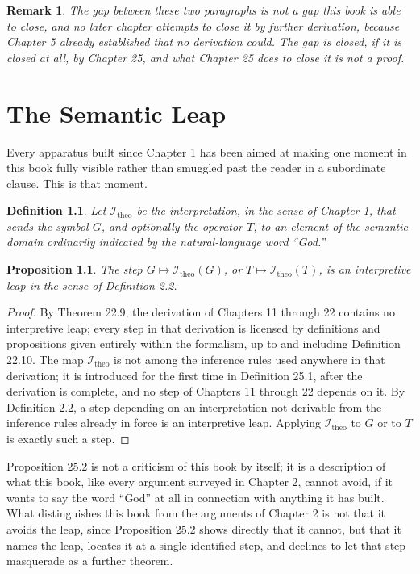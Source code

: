 \documentclass[11pt]{book}
\newtheorem{definition}[theorem]{Definition}
\newtheorem{proposition}[theorem]{Proposition}
\newtheorem{remark}[theorem]{Remark}
\begin{document}
\begin{remark}
The gap between these two paragraphs is not a gap this book is able to close, and no later chapter attempts to close it by further derivation, because Chapter 5 already established that no derivation could. The gap is closed, if it is closed at all, by Chapter 25, and what Chapter 25 does to close it is not a proof.
\end{remark}

\chapter{The Semantic Leap}

Every apparatus built since Chapter 1 has been aimed at making one moment in this book fully visible rather than smuggled past the reader in a subordinate clause. This is that moment.

\begin{definition}
Let $\mathcal I_{\mathrm{theo}}$ be the interpretation, in the sense of Chapter 1, that sends the symbol $G$, and optionally the operator $T$, to an element of the semantic domain ordinarily indicated by the natural-language word ``God.''
\end{definition}

\begin{proposition}
The step $G \mapsto \mathcal I_{\mathrm{theo}}(G)$, or $T \mapsto \mathcal I_{\mathrm{theo}}(T)$, is an interpretive leap in the sense of Definition 2.2.
\end{proposition}

\begin{proof}
By Theorem 22.9, the derivation of Chapters 11 through 22 contains no interpretive leap; every step in that derivation is licensed by definitions and propositions given entirely within the formalism, up to and including Definition 22.10. The map $\mathcal I_{\mathrm{theo}}$ is not among the inference rules used anywhere in that derivation; it is introduced for the first time in Definition 25.1, after the derivation is complete, and no step of Chapters 11 through 22 depends on it. By Definition 2.2, a step depending on an interpretation not derivable from the inference rules already in force is an interpretive leap. Applying $\mathcal I_{\mathrm{theo}}$ to $G$ or to $T$ is exactly such a step.
\end{proof}

Proposition 25.2 is not a criticism of this book by itself; it is a description of what this book, like every argument surveyed in Chapter 2, cannot avoid, if it wants to say the word ``God'' at all in connection with anything it has built. What distinguishes this book from the arguments of Chapter 2 is not that it avoids the leap, since Proposition 25.2 shows directly that it cannot, but that it names the leap, locates it at a single identified step, and declines to let that step masquerade as a further theorem.
\end{document}
